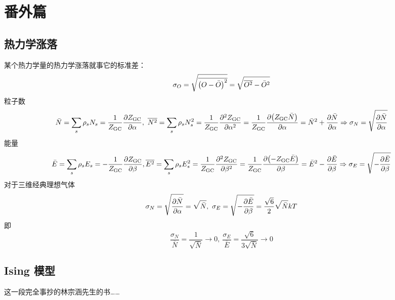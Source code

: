 \section{番外篇}

\subsection{热力学涨落}

某个热力学量的热力学涨落就事它的标准差：\[
    \sigma_{O} = \sqrt{\overline{\qty(O - \bar{O})^2}} = \sqrt{\overline{O^2} - \bar{O}^2}
\] 粒子数 \[
    \bar{N} = \sum_s \rho_s N_s = \frac{1}{Z_{\text{GC}}} \pdv{Z_{\text{GC}}}{\alpha},\ \overline{N^2} = \sum_s \rho_s N_s^2 = \frac{1}{Z_{\text{GC}}}\pdv[2]{Z_{\text{GC}}}{\alpha} = \frac{1}{Z_{\text{GC}}} \pdv{\qty(Z_{\text{GC}} \bar{N})}{\alpha} = \bar{N}^2 + \pdv{\bar{N}}{\alpha} \Rightarrow \sigma_{N} = \sqrt{\pdv{\bar{N}}{\alpha}}
\] 能量 \[
    \bar{E} = \sum_s \rho_s E_s = - \frac{1}{Z_{\text{GC}}} \pdv{Z_{\text{GC}}}{\beta}, \overline{E^2} = \sum_s \rho_s E_s^2 = \frac{1}{Z_{\text{GC}}} \pdv[2]{Z_{\text{GC}}}{\beta} = \frac{1}{Z_{\text{GC}}} \pdv{\qty(- Z_{\text{GC}} \bar{E})}{\beta} = \bar{E}^2 - \pdv{\bar{E}}{\beta} \Rightarrow \sigma_{E} = \sqrt{- \pdv{\bar{E}}{\beta}}
\] 对于三维经典理想气体 \[
    \sigma_{N} = \sqrt{\pdv{\bar{N}}{\alpha}} = \sqrt{\bar{N}},\ \sigma_{E} = \sqrt{- \pdv{\bar{E}}{\beta}} = \frac{\sqrt{6}}{2} \sqrt{\bar{N}} k T
\] 即 \[
    \frac{\sigma_{N}}{\bar{N}} = \frac{1}{\sqrt{\bar{N}}} \to 0,\ \frac{\sigma_{E}}{\bar{E}} = \frac{\sqrt{6}}{3 \sqrt{\bar{N}}} \to 0
\]

\subsection{Ising 模型}

这一段完全事抄的林宗涵先生的书……

